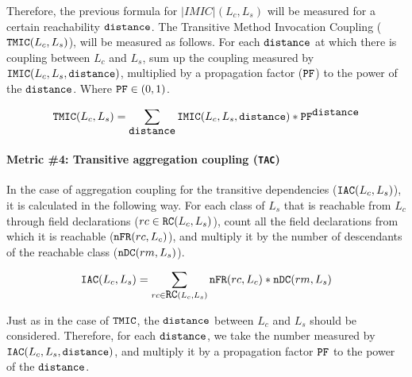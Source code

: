 Therefore, the previous formula for $|IMIC|(L_c,L_s)$ will be measured for a certain reachability $\verb|distance|$. 
The Transitive Method Invocation Coupling ($\verb|TMIC|(L_c,L_s)$), will be measured as follows. For each $\verb|distance|$ at which there is coupling between $L_c$ and $L_s$, sum up the coupling measured by $\verb|IMIC|(L_c,L_s, \verb|distance|)$, multiplied by a propagation factor ($\verb|PF|$) to the power of the $\verb|distance|$. Where $\verb|PF| \in (0,1)$.

\begin{equation}
\label{eqn:tmic}
  \verb|TMIC|(L_c,L_s) = \sum_{\verb|distance|} \verb|IMIC|(L_c,L_s, \verb|distance|) * \verb|PF|^{\verb|distance|}
\end{equation}

\paragraph{Metric \#4: Transitive aggregation coupling (\texttt{TAC})}
In the case of aggregation coupling for the transitive dependencies ($\verb|IAC|(L_c,L_s)$), it is calculated in the following way. For each class of $L_s$ that is reachable from $L_c$ through field declarations ($rc \in \verb|RC|(L_c,L_s)$), count all the field declarations from which it is reachable ($\verb|nFR|(rc,L_c)$), and multiply it by the number of descendants of the reachable class ($\verb|nDC|(rm, L_s)$).

\begin{equation}
\label{eqn:iac}
  \verb|IAC|(L_c,L_s) = \sum_{rc \in \verb|RC|(L_c,L_s)} \verb|nFR|(rc,L_c) * \verb|nDC|(rm, L_s)
\end{equation}

Just as in the case of $\verb|TMIC|$, the $\verb|distance|$ between $L_c$ and $L_s$ should be considered. Therefore, for each $\verb|distance|$, we take the number measured by $\verb|IAC|(L_c,L_s, \verb|distance|)$, and multiply it by a propagation factor $\verb|PF|$ to the power of the $\verb|distance|$.

